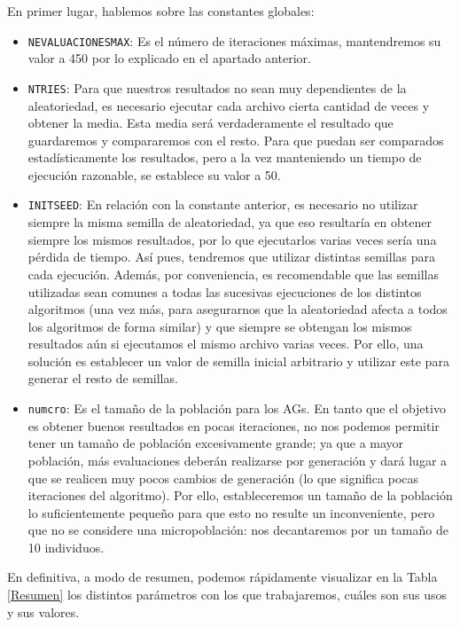 En primer lugar, hablemos sobre las constantes globales:
\begin{itemize}
	\item \texttt{NEVALUACIONESMAX}: Es el número de iteraciones máximas, mantendremos su valor a 450 por lo explicado en el apartado anterior. 
	\item \texttt{NTRIES}: Para que nuestros resultados no sean muy dependientes de la aleatoriedad, es necesario ejecutar cada archivo cierta cantidad de veces y obtener la media. 
Esta media será verdaderamente el resultado que guardaremos y compararemos con el resto. 
Para que puedan ser comparados estadísticamente los resultados, pero a la vez manteniendo un tiempo de ejecución razonable, se establece su valor a 50.
	\item \texttt{INITSEED}: En relación con la constante anterior, es necesario no utilizar siempre la misma semilla de aleatoriedad, ya que eso resultaría en obtener siempre los mismos resultados, por lo que ejecutarlos varias veces sería una pérdida de tiempo. 
Así pues, tendremos que utilizar distintas semillas para cada ejecución. 
Además, por conveniencia, es recomendable que las semillas utilizadas sean comunes a todas las sucesivas ejecuciones de los distintos algoritmos (una vez más, para asegurarnos que la aleatoriedad afecta a todos los algoritmos de forma similar) y que siempre se obtengan los mismos resultados aún si ejecutamos el mismo archivo varias veces. 
Por ello, una solución es establecer un valor de semilla inicial arbitrario y utilizar este para generar el resto de semillas.
	\item \texttt{numcro}: Es el tamaño de la población para los AGs. 
	En tanto que el objetivo es obtener buenos resultados en pocas iteraciones, no nos podemos permitir tener un tamaño de población excesivamente grande; ya que a mayor población, más evaluaciones deberán realizarse por generación y dará lugar a que se realicen muy pocos cambios de generación (lo que significa pocas iteraciones del algoritmo). 
	Por ello, estableceremos un tamaño de la población lo suficientemente pequeño para que esto no resulte un inconveniente, pero que no se considere una micropoblación: nos decantaremos por un tamaño de 10 individuos. 
\end{itemize}

En definitiva,  a modo de resumen, podemos rápidamente visualizar en la Tabla \ref{Resumen} los distintos parámetros con los que trabajaremos, cuáles son sus usos y sus valores.

